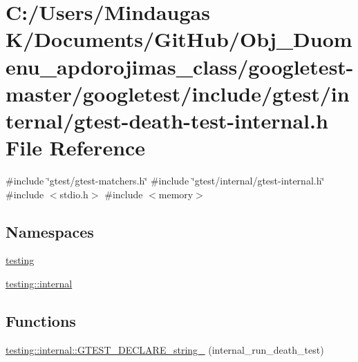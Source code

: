 \hypertarget{googletest-master_2googletest_2include_2gtest_2internal_2gtest-death-test-internal_8h}{}\section{C\+:/\+Users/\+Mindaugas K/\+Documents/\+Git\+Hub/\+Obj\+\_\+\+Duomenu\+\_\+apdorojimas\+\_\+class/googletest-\/master/googletest/include/gtest/internal/gtest-\/death-\/test-\/internal.h File Reference}
\label{googletest-master_2googletest_2include_2gtest_2internal_2gtest-death-test-internal_8h}
{\ttfamily \#include \char`\"{}gtest/gtest-\/matchers.\+h\char`\"{}}\newline
{\ttfamily \#include \char`\"{}gtest/internal/gtest-\/internal.\+h\char`\"{}}\newline
{\ttfamily \#include $<$stdio.\+h$>$}\newline
{\ttfamily \#include $<$memory$>$}\newline
\subsection*{Namespaces}
\begin{DoxyCompactItemize}
\item 
 \mbox{\hyperlink{namespacetesting}{testing}}
\item 
 \mbox{\hyperlink{namespacetesting_1_1internal}{testing\+::internal}}
\end{DoxyCompactItemize}
\subsection*{Functions}
\begin{DoxyCompactItemize}
\item 
\mbox{\hyperlink{namespacetesting_1_1internal_ac20f635c3285878fc1195ce687f23950}{testing\+::internal\+::\+G\+T\+E\+S\+T\+\_\+\+D\+E\+C\+L\+A\+R\+E\+\_\+string\+\_\+}} (internal\+\_\+run\+\_\+death\+\_\+test)
\end{DoxyCompactItemize}
